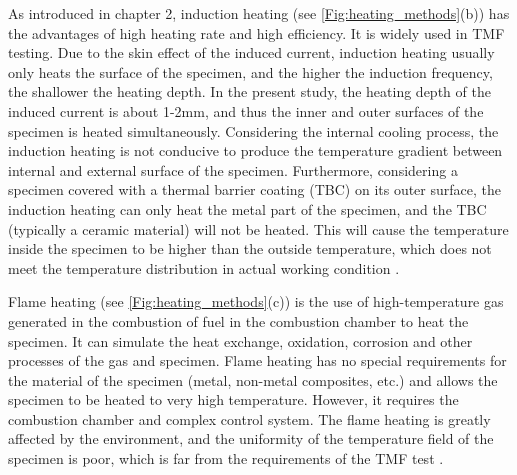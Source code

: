 
As introduced in chapter 2, induction heating (see \ref{Fig:heating_methods}(b)) has the advantages of high heating rate and high efficiency. It is widely used in TMF testing.
Due to the skin effect of the induced current, induction heating usually only heats the surface of the specimen, and the higher the induction frequency, the shallower the heating depth.
In the present study, the heating depth of the induced current is about 1-2mm, and thus the inner and outer surfaces of the specimen is heated simultaneously.
Considering the internal cooling process, the induction heating is not conducive to produce the temperature gradient between internal and external surface of the specimen. Furthermore, considering a specimen covered with a thermal barrier coating (TBC) on its outer surface, the induction heating can only heat the metal part of the specimen, and the TBC (typically a ceramic material) will not be heated. This will cause the temperature inside the specimen to be higher than the outside temperature, which does not meet the temperature distribution in actual working condition \cite{BRENDEL2008234}.

Flame heating (see \ref{Fig:heating_methods}(c)) is the use of high-temperature gas generated in the combustion of fuel in the combustion chamber to heat the specimen. It can simulate the heat exchange, oxidation, corrosion and other processes of the gas and specimen. Flame heating has no special requirements for the material of the specimen (metal, non-metal composites, etc.) and allows the specimen to be heated to very high temperature. However, it requires the combustion chamber and complex control system. The flame heating is greatly affected by the environment, and the uniformity of the temperature field of the specimen is poor, which is far from the requirements of the TMF test \cite{MAUGET2017225}.

